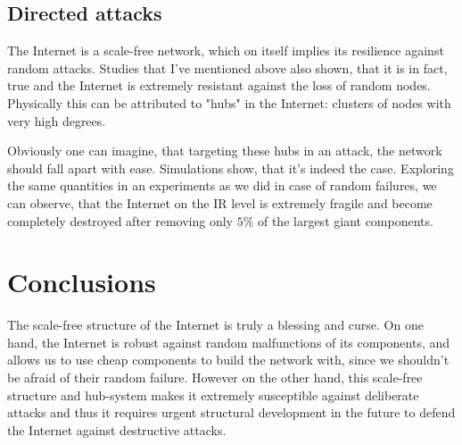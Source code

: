 \subsection{Directed attacks}
The Internet is a scale-free network, which on itself implies its resilience against random attacks. Studies that I've mentioned above also shown, that it is in fact, true and the Internet is extremely resistant against the loss of random nodes. Physically this can be attributed to "hubs" in the Internet: clusters of nodes with very high degrees.

Obviously one can imagine, that targeting these hubs in an attack, the network should fall apart with ease. Simulations show, that it's indeed the case. Exploring the same quantities in an experiments as we did in case of random failures, we can observe, that the Internet on the IR level is extremely fragile and become completely destroyed after removing only $5\%$ of the largest giant components.

\section{Conclusions}
The scale-free structure of the Internet is truly a blessing and curse. On one hand, the Internet is robust against random malfunctions of its components, and allows us to use cheap components to build the network with, since we shouldn't be afraid of their random failure. However on the other hand, this scale-free structure and hub-system makes it extremely susceptible against deliberate attacks and thus it requires urgent structural development in the future to defend the Internet against destructive attacks.